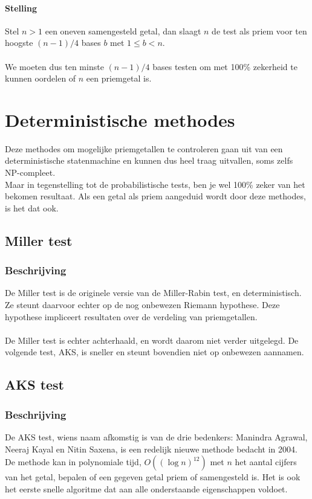 \documentclass[11pt]{article}
\begin{document}
\paragraph{Stelling}
Stel $n > 1$ een oneven samengesteld getal, dan slaagt $n$ de test als priem voor ten hoogste $(n-1)/4$ bases $b$ met $1 \le b < n$.
\\
\\
We moeten dus ten minste $(n-1)/4$ bases testen om met 100\% zekerheid te kunnen oordelen of $n$ een priemgetal is.

\pagebreak

\section{Deterministische methodes}

Deze methodes om mogelijke priemgetallen te controleren gaan uit van een deterministische statenmachine en kunnen dus heel traag uitvallen, soms zelfs NP-compleet.
\\
Maar in tegenstelling tot de probabilistische tests, ben je wel 100\% zeker van het bekomen resultaat. Als een getal als priem aangeduid wordt door deze methodes, is het dat ook. 

\subsection{Miller test}

\subsubsection{Beschrijving}
De Miller test is de originele versie van de Miller-Rabin test, en deterministisch. Ze steunt daarvoor echter op de nog onbewezen Riemann hypothese. Deze hypothese impliceert resultaten over de verdeling van priemgetallen.
\\
\\
De Miller test is echter achterhaald, en wordt daarom niet verder uitgelegd. De volgende test, AKS, is sneller en steunt bovendien niet op onbewezen aannamen.

\subsection{AKS test}

\subsubsection{Beschrijving}
De AKS test, wiens naam afkomstig is van de drie bedenkers: Manindra Agrawal, Neeraj Kayal en Nitin Saxena, is een redelijk nieuwe methode bedacht in 2004. De methode kan in polynomiale tijd, $O((\log{n})^{12})$ met $n$ het aantal cijfers van het getal, bepalen of een gegeven getal priem of samengesteld is.
Het is ook het eerste snelle algoritme dat aan alle onderstaande eigenschappen voldoet.
\end{document}
